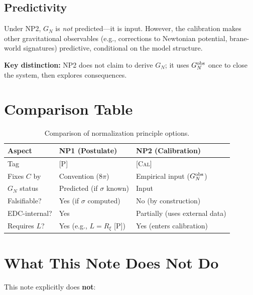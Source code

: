 \documentclass[11pt,a4paper]{article}
\theoremstyle{definition}
\newcommand{\Post}{\textsc{[P]}}
\newcommand{\Cal}{\textsc{[Cal]}}
\begin{document}
\subsection{Predictivity}

Under NP2, $G_N$ is \textit{not} predicted---it is input. However, the
calibration makes other gravitational observables (e.g., corrections to
Newtonian potential, brane-world signatures) predictive, conditional on
the model structure.

\textbf{Key distinction:} NP2 does not claim to derive $G_N$; it uses
$G_N^{\rm obs}$ once to close the system, then explores consequences.

\section{Comparison Table}

\begin{table}[h]
\centering
\begin{tabular}{lll}
\toprule
\textbf{Aspect} & \textbf{NP1 (Postulate)} & \textbf{NP2 (Calibration)} \\
\midrule
Tag & \Post & \Cal \\
Fixes $C$ by & Convention ($8\pi$) & Empirical input ($G_N^{\rm obs}$) \\
$G_N$ status & Predicted (if $\sigma$ known) & Input \\
Falsifiable? & Yes (if $\sigma$ computed) & No (by construction) \\
EDC-internal? & Yes & Partially (uses external data) \\
Requires $L$? & Yes (e.g., $L = R_\xi$ \Post) & Yes (enters calibration) \\
\bottomrule
\end{tabular}
\caption{Comparison of normalization principle options.}
\label{tab:compare}
\end{table}

\section{What This Note Does Not Do}

This note explicitly does \textbf{not}:
\end{document}
